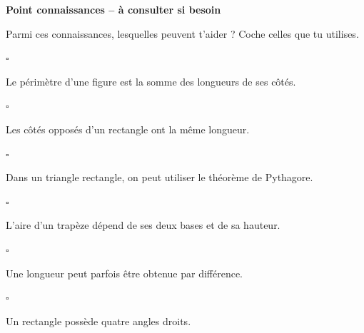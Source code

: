 \documentclass[11pt,a4paper]{article}
\newcommand{\casecocher}[1]{%
\noindent
\(\square\)\hspace{0.35em}%
\parbox[t]{0.89\linewidth}{#1}
\par
\vspace{0.15em}
}
\begin{document}
\vspace{0.8mm}

\begin{connaissancesbox}

{\sffamily\bfseries\color{SavoirC}
Point connaissances -- à consulter si besoin}

\smallskip

Parmi ces connaissances, lesquelles peuvent t'aider ?
Coche celles que tu utilises.

\smallskip

\begin{minipage}[t]{0.49\linewidth}

\casecocher{Le périmètre d'une figure est la somme
des longueurs de ses côtés.}

\casecocher{Les côtés opposés d'un rectangle ont la même longueur.}

\casecocher{Dans un triangle rectangle, on peut utiliser
le théorème de Pythagore.}

\end{minipage}
\hfill
\begin{minipage}[t]{0.49\linewidth}

\casecocher{L'aire d'un trapèze dépend de ses deux bases
et de sa hauteur.}

\casecocher{Une longueur peut parfois être obtenue par différence.}

\casecocher{Un rectangle possède quatre angles droits.}

\end{minipage}

\end{connaissancesbox}

\newpage

\end{document}
